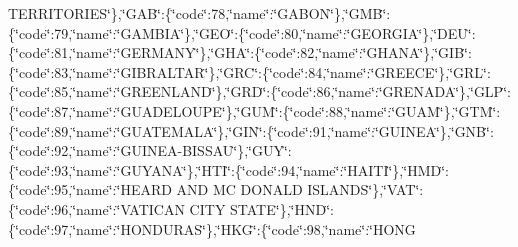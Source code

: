 \begin{DoxyCompactItemize}
T\-E\-R\-R\-I\-T\-O\-R\-I\-E\-S\char`\"{}\},\char`\"{}G\-A\-B\char`\"{}\-:\{\char`\"{}code\char`\"{}\-:78,\char`\"{}name\char`\"{}\-:\char`\"{}G\-A\-B\-O\-N\char`\"{}\},\char`\"{}G\-M\-B\char`\"{}\-:\{\char`\"{}code\char`\"{}\-:79,\char`\"{}name\char`\"{}\-:\char`\"{}G\-A\-M\-B\-I\-A\char`\"{}\},\char`\"{}G\-E\-O\char`\"{}\-:\{\char`\"{}code\char`\"{}\-:80,\char`\"{}name\char`\"{}\-:\char`\"{}G\-E\-O\-R\-G\-I\-A\char`\"{}\},\char`\"{}D\-E\-U\char`\"{}\-:\{\char`\"{}code\char`\"{}\-:81,\char`\"{}name\char`\"{}\-:\char`\"{}G\-E\-R\-M\-A\-N\-Y\char`\"{}\},\char`\"{}G\-H\-A\char`\"{}\-:\{\char`\"{}code\char`\"{}\-:82,\char`\"{}name\char`\"{}\-:\char`\"{}G\-H\-A\-N\-A\char`\"{}\},\char`\"{}G\-I\-B\char`\"{}\-:\{\char`\"{}code\char`\"{}\-:83,\char`\"{}name\char`\"{}\-:\char`\"{}G\-I\-B\-R\-A\-L\-T\-A\-R\char`\"{}\},\char`\"{}G\-R\-C\char`\"{}\-:\{\char`\"{}code\char`\"{}\-:84,\char`\"{}name\char`\"{}\-:\char`\"{}G\-R\-E\-E\-C\-E\char`\"{}\},\char`\"{}G\-R\-L\char`\"{}\-:\{\char`\"{}code\char`\"{}\-:85,\char`\"{}name\char`\"{}\-:\char`\"{}G\-R\-E\-E\-N\-L\-A\-N\-D\char`\"{}\},\char`\"{}G\-R\-D\char`\"{}\-:\{\char`\"{}code\char`\"{}\-:86,\char`\"{}name\char`\"{}\-:\char`\"{}G\-R\-E\-N\-A\-D\-A\char`\"{}\},\char`\"{}G\-L\-P\char`\"{}\-:\{\char`\"{}code\char`\"{}\-:87,\char`\"{}name\char`\"{}\-:\char`\"{}G\-U\-A\-D\-E\-L\-O\-U\-P\-E\char`\"{}\},\char`\"{}G\-U\-M\char`\"{}\-:\{\char`\"{}code\char`\"{}\-:88,\char`\"{}name\char`\"{}\-:\char`\"{}G\-U\-A\-M\char`\"{}\},\char`\"{}G\-T\-M\char`\"{}\-:\{\char`\"{}code\char`\"{}\-:89,\char`\"{}name\char`\"{}\-:\char`\"{}G\-U\-A\-T\-E\-M\-A\-L\-A\char`\"{}\},\char`\"{}G\-I\-N\char`\"{}\-:\{\char`\"{}code\char`\"{}\-:91,\char`\"{}name\char`\"{}\-:\char`\"{}G\-U\-I\-N\-E\-A\char`\"{}\},\char`\"{}G\-N\-B\char`\"{}\-:\{\char`\"{}code\char`\"{}\-:92,\char`\"{}name\char`\"{}\-:\char`\"{}G\-U\-I\-N\-E\-A-\/B\-I\-S\-S\-A\-U\char`\"{}\},\char`\"{}G\-U\-Y\char`\"{}\-:\{\char`\"{}code\char`\"{}\-:93,\char`\"{}name\char`\"{}\-:\char`\"{}G\-U\-Y\-A\-N\-A\char`\"{}\},\char`\"{}H\-T\-I\char`\"{}\-:\{\char`\"{}code\char`\"{}\-:94,\char`\"{}name\char`\"{}\-:\char`\"{}H\-A\-I\-T\-I\char`\"{}\},\char`\"{}H\-M\-D\char`\"{}\-:\{\char`\"{}code\char`\"{}\-:95,\char`\"{}name\char`\"{}\-:\char`\"{}H\-E\-A\-R\-D A\-N\-D M\-C D\-O\-N\-A\-L\-D I\-S\-L\-A\-N\-D\-S\char`\"{}\},\char`\"{}V\-A\-T\char`\"{}\-:\{\char`\"{}code\char`\"{}\-:96,\char`\"{}name\char`\"{}\-:\char`\"{}V\-A\-T\-I\-C\-A\-N C\-I\-T\-Y S\-T\-A\-T\-E\char`\"{}\},\char`\"{}H\-N\-D\char`\"{}\-:\{\char`\"{}code\char`\"{}\-:97,\char`\"{}name\char`\"{}\-:\char`\"{}H\-O\-N\-D\-U\-R\-A\-S\char`\"{}\},\char`\"{}H\-K\-G\char`\"{}\-:\{\char`\"{}code\char`\"{}\-:98,\char`\"{}name\char`\"{}\-:\char`\"{}H\-O\-N\-G 
\end{DoxyCompactItemize}
